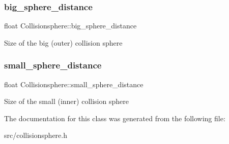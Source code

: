 \subsubsection{\texorpdfstring{big\+\_\+sphere\+\_\+distance}{big\_sphere\_distance}}
{\footnotesize\ttfamily float Collisionsphere\+::big\+\_\+sphere\+\_\+distance}

Size of the big (outer) collision sphere \mbox{\label{class_collisionsphere_ae5430c092ea0436edfe0adeb79402ff2}} 
\subsubsection{\texorpdfstring{small\+\_\+sphere\+\_\+distance}{small\_sphere\_distance}}
{\footnotesize\ttfamily float Collisionsphere\+::small\+\_\+sphere\+\_\+distance}

Size of the small (inner) collision sphere 

The documentation for this class was generated from the following file\+:\begin{DoxyCompactItemize}
\item 
src/collisionsphere.\+h\end{DoxyCompactItemize}
